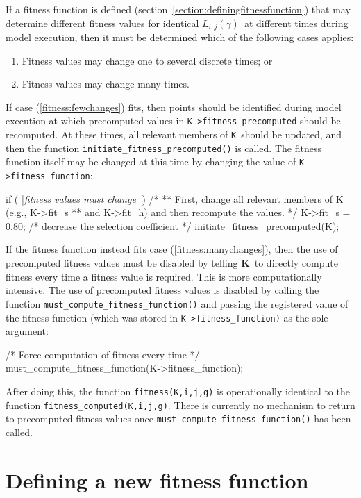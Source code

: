 \documentclass[12pt,twoside,letterpaper,fleqn]{report}
\numberwithin{equation}{section}  %
\newcommand{\K}{{\bf K}}
\newcommand{\KK}{\mbox{{\tt K}}}  %
\newcommand{\Lijg}{\mbox{$L_{i,j}(\gamma)$}}     %
\begin{document}
{If a fitness function is defined (section~\ref{section:definingfitnessfunction}) that may determine different fitness values for identical \Lijg\ at different times during model execution, then it must be determined which of the following cases applies:
\begin{enumerate}
	\item\label{fitness:fewchanges} Fitness values may change one to several discrete times; or
	\item\label{fitness:manychanges} Fitness values may change many times. 
\end{enumerate}
If case (\ref{fitness:fewchanges}) fits, then points should be identified during model execution at which precomputed values in \lstinline{K->fitness_precomputed} should be recomputed.  At these times, all relevant members of \KK\ should be updated, and then the function \lstinline{initiate_fitness_precomputed()} is called.  The fitness function itself may be changed at this time by changing the value of \lstinline{K->fitness_function}:
\begin{C}[gobble=4,escapechar=|]
    if ( |{\it fitness values must change}| ) {
        /*
        ** First, change all relevant members of K (e.g., K->fit_s 
        ** and K->fit_h) and then recompute the values.
        */
        K->fit_s = 0.80;  /* decrease the selection coefficient */
        initiate_fitness_precomputed(K);
    }
\end{C}
If the fitness function instead fits case (\ref{fitness:manychanges}), then the use of precomputed fitness values must be disabled by telling \K\ to directly compute fitness every time a fitness value is required.  This is more computationally intensive.  The use of precomputed fitness values is disabled by calling the function \lstinline{must_compute_fitness_function()} and passing the registered value of the fitness function (which was stored in \lstinline{K->fitness_function)} as the sole argument:
\begin{C}[gobble=4]
    /* Force computation of fitness every time */
    must_compute_fitness_function(K->fitness_function);
\end{C}
After doing this, the function \lstinline{fitness(K,i,j,g)} is operationally identical to the function \lstinline{fitness_computed(K,i,j,g)}.  There is currently no mechanism to return to precomputed fitness values once \lstinline{must_compute_fitness_function()} has been called.

\section{Defining a new fitness function\label{section:definingfitnessfunction}}

}
\end{document}
